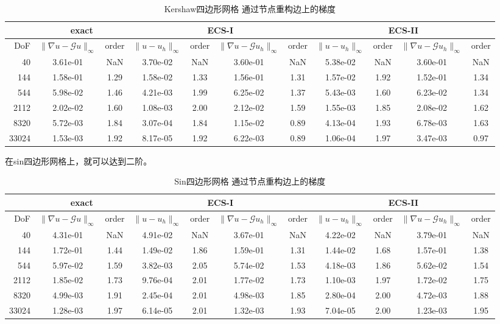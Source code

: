 \documentclass[12pt,a4paper]{article}
\theoremstyle{plain}
\begin{document}
\begin{table}[h]
\centering
\scriptsize
\begin{tabular}{r|cc|cc|cc|cc|cc}
\hline
& \multicolumn{2}{c|}{exact} & \multicolumn{4}{c}{ECS-I} & \multicolumn{4}{|c}{ECS-II} \\
\hline
DoF & $\|\nabla u - \mathcal{G} u\|_\infty$ & order & $\|u - u_h\|_\infty$ & order & $\|\nabla u - \mathcal{G} u_h\|_\infty$ & order & $\|u - u_h\|_\infty$ & order & $\|\nabla u - \mathcal{G} u_h\|_\infty$ & order \\
\hline
40 & 3.61e-01 & NaN & 3.70e-02 & NaN & 3.60e-01 & NaN & 5.38e-02 & NaN & 3.60e-01 & NaN \\
144 & 1.58e-01 & 1.29 & 1.58e-02 & 1.33 & 1.56e-01 & 1.31 & 1.57e-02 & 1.92 & 1.52e-01 & 1.34 \\
544 & 5.98e-02 & 1.46 & 4.21e-03 & 1.99 & 6.25e-02 & 1.37 & 5.43e-03 & 1.60 & 6.23e-02 & 1.34 \\
2112 & 2.02e-02 & 1.60 & 1.08e-03 & 2.00 & 2.12e-02 & 1.59 & 1.55e-03 & 1.85 & 2.08e-02 & 1.62 \\
8320 & 5.72e-03 & 1.84 & 3.07e-04 & 1.84 & 1.15e-02 & 0.89 & 4.13e-04 & 1.93 & 6.78e-03 & 1.63 \\
33024 & 1.53e-03 & 1.92 & 8.17e-05 & 1.92 & 6.22e-03 & 0.89 & 1.06e-04 & 1.97 & 3.47e-03 & 0.97 \\
\hline
\end{tabular}
\caption{Kershaw四边形网格 通过节点重构边上的梯度}
\end{table}

在sin四边形网格上，就可以达到二阶。

\begin{table}[h]
\centering
\scriptsize
\begin{tabular}{r|cc|cc|cc|cc|cc}
\hline
& \multicolumn{2}{c|}{exact} & \multicolumn{4}{c}{ECS-I} & \multicolumn{4}{|c}{ECS-II} \\
\hline
DoF & $\|\nabla u - \mathcal{G} u\|_\infty$ & order & $\|u - u_h\|_\infty$ & order & $\|\nabla u - \mathcal{G} u_h\|_\infty$ & order & $\|u - u_h\|_\infty$ & order & $\|\nabla u - \mathcal{G} u_h\|_\infty$ & order \\
\hline
40 & 4.31e-01 & NaN & 4.91e-02 & NaN & 3.67e-01 & NaN & 4.22e-02 & NaN & 3.79e-01 & NaN \\
144 & 1.72e-01 & 1.44 & 1.49e-02 & 1.86 & 1.59e-01 & 1.31 & 1.44e-02 & 1.68 & 1.57e-01 & 1.38 \\
544 & 5.97e-02 & 1.59 & 3.82e-03 & 2.05 & 5.74e-02 & 1.53 & 4.18e-03 & 1.86 & 5.62e-02 & 1.54 \\
2112 & 1.85e-02 & 1.73 & 9.76e-04 & 2.01 & 1.77e-02 & 1.73 & 1.10e-03 & 1.97 & 1.72e-02 & 1.75 \\
8320 & 4.99e-03 & 1.91 & 2.45e-04 & 2.01 & 4.98e-03 & 1.85 & 2.80e-04 & 2.00 & 4.72e-03 & 1.88 \\
33024 & 1.28e-03 & 1.97 & 6.14e-05 & 2.01 & 1.32e-03 & 1.93 & 7.04e-05 & 2.00 & 1.23e-03 & 1.95 \\
\hline
\end{tabular}
\caption{Sin四边形网格 通过节点重构边上的梯度}
\end{table}
\end{document}
